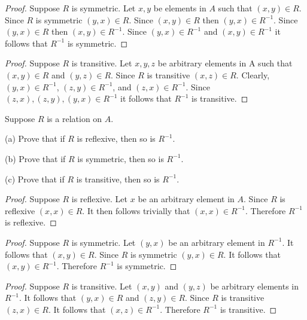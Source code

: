 \begin{proof}
    Suppose $R$ is symmetric.
    Let $x, y$ be elements in $A$ such that $(x, y) \in R$.
    Since $R$ is symmetric $(y, x) \in R$.
    Since $(x, y) \in R$ then $(y, x) \in R^{-1}$.
    Since $(y, x) \in R$ then $(x, y) \in R^{-1}$.
    Since $(y, x) \in R^{-1}$ and $(x, y) \in R^{-1}$ it follows that
        $R^{-1}$ is symmetric.
\end{proof}

\begin{proof}
    Suppose $R$ is transitive.
    Let $x, y, z$ be arbitrary elements in A such that $(x, y) \in R$
    and $(y, z) \in R$. Since $R$ is transitive $(x, z) \in R$.
    Clearly, $(y, x) \in R^{-1}$, $(z, y) \in R^{-1}$, and $(z, x) \in R^{-1}$.
    Since $(z, x), (z, y), (y, x)\in R^{-1}$ it follows that
        $R^{-1}$ is transitive.
\end{proof}

\begin{tcolorbox}[title=Problem 12, breakable]
    Suppose $R$ is a relation on $A$.

    (a) Prove that if $R$ is reflexive, then so is $R^{-1}$.

    (b) Prove that if $R$ is symmetric, then so is $R^{-1}$.

    (c) Prove that if $R$ is transitive, then so is $R^{-1}$.
\end{tcolorbox}

\begin{proof}    
    Suppose $R$ is reflexive.
    Let $x$ be an arbitrary element in $A$.
    Since $R$ is reflexive $(x, x) \in R$.
    It then follows trivially that $(x, x) \in R^{-1}$.
    Therefore $R^{-1}$ is reflexive.
\end{proof}

\begin{proof}
    Suppose $R$ is symmetric.
    Let $(y, x)$ be an arbitrary element in $R^{-1}$.
    It follows that $(x, y) \in R$.
    Since $R$ is symmetric $(y, x) \in R$.
    It follows that $(x, y) \in R^{-1}$.
    Therefore $R^{-1}$ is symmetric.
\end{proof}

\begin{proof}
    Suppose $R$ is transitive.
    Let $(x, y)$ and $(y, z)$ be arbitrary elements in $R^{-1}$.
    It follows that $(y, x) \in R$ and $(z, y) \in R$.
    Since $R$ is transitive $(z, x) \in R$.
    It follows that $(x, z) \in R^{-1}$.
    Therefore $R^{-1}$ is transitive. 
\end{proof}

